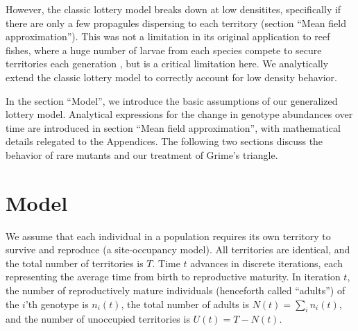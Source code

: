 \documentclass[11pt]{article}
\begin{document}
However, the classic lottery model breaks down at low densitites, specifically if there are only  a few propagules dispersing to each territory (section ``Mean field approximation''). This was not a limitation in its original application to reef fishes, where a huge number of larvae from each species compete to secure territories each generation \cite{chesson_1981}, but is a critical limitation here. We analytically extend the classic lottery model to correctly account for low density behavior. 


In the section ``Model'', we introduce the basic assumptions of our generalized lottery model. Analytical expressions for the change in genotype abundances over time are introduced in section ``Mean field approximation'', with mathematical details relegated to the Appendices. The following two sections discuss the behavior of rare mutants and our treatment of Grime's triangle. 
 
\section*{Model}\label{sec:model}

We assume that each individual in a population requires its own territory to survive and reproduce (a site-occupancy model). All territories are identical, and the total number of territories is $T$. Time $t$ advances in discrete iterations, each representing the average time from birth to reproductive maturity. In iteration $t$, the number of reproductively mature individuals (henceforth called ``adults'') of the $i$'th genotype is $n_i(t)$, the total number of adults is $N(t)=\sum_i n_i(t)$, and the number of unoccupied territories is $U(t)=T-N(t)$. 
\end{document}
